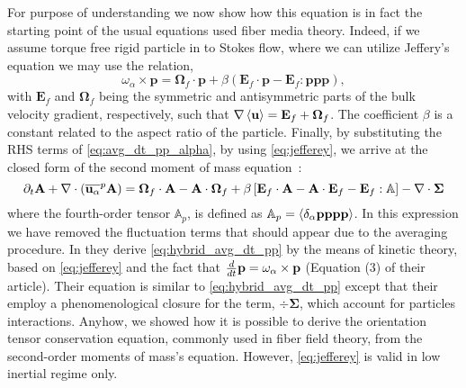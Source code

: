 For purpose of understanding we now show how this equation is in fact the starting point of the usual equations used fiber media theory. 
Indeed, if we assume torque free rigid particle in to Stokes flow, where we can utilize Jeffery's equation \citep{guazzelli2011} we may use the relation,
\begin{equation}
    \omega_\alpha \times \textbf{p}
    = \bm{\Omega}_f\cdot\textbf{p}
    + \beta\left(
        \textbf{E}_f\cdot \textbf{p}
        - \textbf{E}_f : \textbf{ppp}
    \right),
    \label{eq:jefferey}
\end{equation}
with $\textbf{E}_f$ and $\bm{\Omega}_f$ being the symmetric and antisymmetric parts of the bulk velocity gradient, respectively, such that $\mathbf{\nabla}\left<\textbf{u}\right>=\textbf{E}_f+\bm{\Omega}_f$.
The coefficient $\beta$  is a constant related to the aspect ratio of the particle.
Finally, by substituting the RHS terms of \ref{eq:avg_dt_pp_alpha}, by using \ref{eq:jefferey}, we arrive at the closed form of the second moment of mass equation~:
\begin{equation}
    \partial_t \textbf{A}
    + \mathbf{\nabla}\cdot (
        \overline{\textbf{u}_\alpha}^{p}\textbf{A}
    )
    =
    \bm{\Omega}_f \cdot \textbf{A}
    - \textbf{A} \cdot \bm{\Omega}_f
    + \beta\left[
        \textbf{E}_f \cdot \textbf{A}
        -\textbf{A} \cdot \textbf{E}_f
        - \textbf{E}_f : \mathbb{A}
    \right]
    - \mathbf{\nabla}\cdot \mathbf{\Sigma}
    \label{eq:hybrid_avg_dt_pp}
\end{equation}
where the fourth-order tensor $\mathbb{A}_p$, is defined as $\mathbb{A}_p = \left<\delta_\alpha \textbf{pppp}\right>$.
In this expression we have removed the fluctuation terms that should appear due to the averaging procedure. 
In \citet{wang2008objective} they derive \ref{eq:hybrid_avg_dt_pp} by the means of kinetic theory, based on \ref{eq:jefferey} and the fact that $\frac{d}{dt} \textbf{p} = \omega_\alpha \times \textbf{p}$ (Equation (3) of their article).
Their equation is similar to \ref{eq:hybrid_avg_dt_pp} except that their employ a phenomenological closure for the term, $\div \mathbf{\Sigma}$, which account for particles interactions.
Anyhow, we showed how it is possible to derive the orientation tensor conservation equation, commonly used in fiber field theory, from the second-order moments of mass's equation. 
However, \ref{eq:jefferey} is valid in low inertial regime only. 

